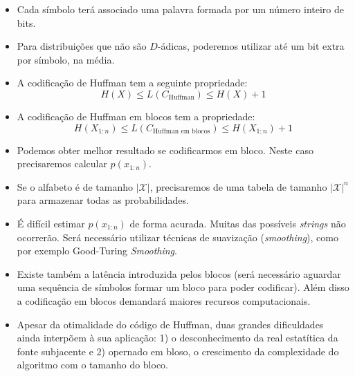 \begin{frame}[allowframebreaks]
  \begin{itemize}
  \item Cada símbolo terá associado uma palavra formada por um número inteiro de bits.
  \item Para distribuições que não são $D$-ádicas, poderemos utilizar até um bit extra por símbolo, na média.
  \item A codificação de Huffman tem a seguinte propriedade:
	\begin{equation}
	H(X) \leq L(C_{\text{Huffman}}) \leq H(X) + 1
	\end{equation}
  \item A codificação de Huffman em blocos tem a propriedade:
	\begin{equation}
        H(X_{1:n}) \leq L(C_{\text{Huffman em blocos}}) \leq H(X_{1:n}) + 1
        \end{equation}
  \item Podemos obter melhor resultado se codificarmos em bloco. Neste caso precisaremos calcular $p(x_{1:n})$.
  \item Se o alfabeto é de tamanho $\vert \mathcal{X} \vert$, precisaremos de uma tabela de tamanho $\vert \mathcal{X} \vert^n$
	para armazenar todas as probabilidades.
  \item É difícil estimar $p(x_{1:n})$ de forma acurada. Muitas das possíveis \textit{strings} não ocorrerão.
	Será necessário utilizar técnicas de suavização (\textit{smoothing}), como por exemplo Good-Turing \textit{Smoothing}.
  \item Existe também a latência introduzida pelos blocos (será necessário aguardar uma sequência de símbolos formar um bloco
	para poder codificar). Além disso a codificação em blocos demandará maiores recursos computacionais.
  \item Apesar da otimalidade do código de Huffman, duas grandes dificuldades ainda interpõem à sua aplicação:
      1) o desconhecimento da real estatítica da fonte subjacente e 2) opernado em bloso, o crescimento da complexidade do algoritmo 
      com o tamanho do bloco.
  \end{itemize}
\end{frame}

